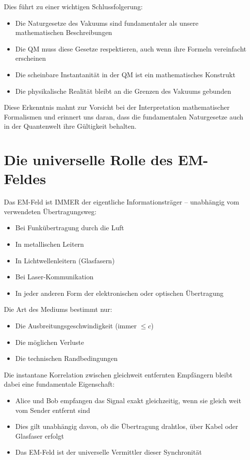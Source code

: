 \documentclass[12pt,a4paper]{article}
\begin{document}
	Dies führt zu einer wichtigen Schlussfolgerung:
	\begin{itemize}
		\item Die Naturgesetze des Vakuums sind fundamentaler als unsere mathematischen Beschreibungen
		\item Die QM muss diese Gesetze respektieren, auch wenn ihre Formeln vereinfacht erscheinen
		\item Die scheinbare Instantanität in der QM ist ein mathematisches Konstrukt
		\item Die physikalische Realität bleibt an die Grenzen des Vakuums gebunden
	\end{itemize}
	
	Diese Erkenntnis mahnt zur Vorsicht bei der Interpretation mathematischer Formalismen und erinnert uns daran, dass die fundamentalen Naturgesetze auch in der Quantenwelt ihre Gültigkeit behalten.
	
	\section{Die universelle Rolle des EM-Feldes}
	Das EM-Feld ist IMMER der eigentliche Informationsträger -- unabhängig vom verwendeten Übertragungsweg:
	\begin{itemize}
		\item Bei Funkübertragung durch die Luft
		\item In metallischen Leitern
		\item In Lichtwellenleitern (Glasfasern)
		\item Bei Laser-Kommunikation
		\item In jeder anderen Form der elektronischen oder optischen Übertragung
	\end{itemize}
	
	Die Art des Mediums bestimmt nur:
	\begin{itemize}
		\item Die Ausbreitungsgeschwindigkeit (immer $\leq c$)
		\item Die möglichen Verluste
		\item Die technischen Randbedingungen
	\end{itemize}
	
	Die instantane Korrelation zwischen gleichweit entfernten Empfängern bleibt dabei eine fundamentale Eigenschaft:
	\begin{itemize}
		\item Alice und Bob empfangen das Signal exakt gleichzeitig, wenn sie gleich weit vom Sender entfernt sind
		\item Dies gilt unabhängig davon, ob die Übertragung drahtlos, über Kabel oder Glasfaser erfolgt
		\item Das EM-Feld ist der universelle Vermittler dieser Synchronität
	\end{itemize}
	
\end{document}
